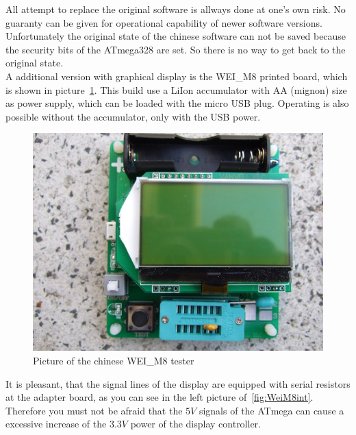 All attempt to replace the original software is allways done at one's own risk.
No guaranty can be given for operational capability of newer software versions.
Unfortunately the original state of the chinese software can not be saved because the 
security bits of the ATmega328 are set. So there is no way to get back to the original state.\\


A additional version with graphical display is the WEI\_M8 printed board, which is shown in picture~\ref{fig:WeiM8}.
This build use a LiIon accumulator with AA (mignon) size as power supply, which can be loaded
with the micro USB plug. Operating is also possible without the accumulator, only with the USB power.

\begin{figure}[H]
\centering
\includegraphics[width=12cm]{../PNG/WEI_M8.JPG}
\caption{Picture of the chinese WEI\_M8 tester}
\label{fig:WeiM8}
\end{figure}

It is pleasant, that the signal lines of the display are equipped with serial resistors
at the adapter board, as you can see in the left picture of~\ref{fig:WeiM8int}.
Therefore you must not be afraid that the \(5V\) signals of the ATmega can cause a excessive
increase of the \(3.3V\) power of the display controller.

